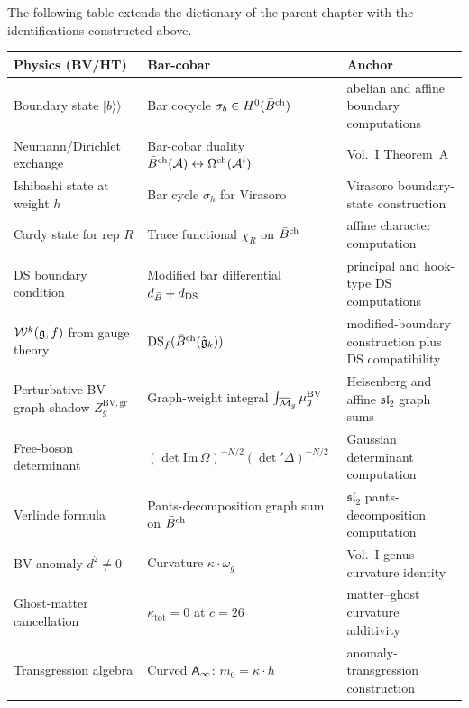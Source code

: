 \begin{remark}
The following table extends the dictionary of the parent chapter with
the identifications constructed above.

\begin{center}
\renewcommand{\arraystretch}{1.15}
\begin{tabular}{|p{}|p{}|p{}|}
\hline
\textbf{Physics (BV/HT)} &
\textbf{Bar-cobar} &
\textbf{Anchor} \\
\hline
Boundary state $|b\rangle\!\rangle$ &
Bar cocycle $\sigma_b \in H^0(\bar{B}^{\mathrm{ch}})$ &
abelian and affine boundary computations \\
\hline
Neumann/Dirichlet exchange &
Bar-cobar duality $\bar{B}^{\mathrm{ch}}(\mathcal{A}) \leftrightarrow \Omega^{\mathrm{ch}}(\mathcal{A}^i)$ &
Vol.~I Theorem~A \\
\hline
Ishibashi state at weight $h$ &
Bar cycle $\sigma_h$ for Virasoro &
Virasoro boundary-state construction \\
\hline
Cardy state for rep $R$ &
Trace functional $\chi_R$ on $\bar{B}^{\mathrm{ch}}$ &
affine character computation \\
\hline
DS boundary condition &
Modified bar differential $d_{\bar{B}} + d_{\mathrm{DS}}$ &
principal and hook-type DS computations \\
\hline
$\mathcal{W}^k(\mathfrak{g},f)$ from gauge theory &
$\mathrm{DS}_f(\bar{B}^{\mathrm{ch}}(\hat{\mathfrak{g}}_k))$ &
modified-boundary construction plus DS compatibility \\
\hline
Perturbative BV graph shadow $Z_g^{\mathrm{BV,gr}}$ &
Graph-weight integral $\int_{\overline{\mathcal{M}}_g} \mu^{\mathrm{BV}}_g$ &
Heisenberg and affine $\mathfrak{sl}_2$ graph sums \\
\hline
Free-boson determinant &
$(\det \mathrm{Im}\,\Omega)^{-N/2} (\det{}'\Delta)^{-N/2}$ &
Gaussian determinant computation \\
\hline
Verlinde formula &
Pants-decomposition graph sum on $\bar{B}^{\mathrm{ch}}$ &
$\mathfrak{sl}_2$ pants-decomposition computation \\
\hline
BV anomaly $d^2 \neq 0$ &
Curvature $\kappa \cdot \omega_g$ &
Vol.~I genus-curvature identity \\
\hline
Ghost-matter cancellation &
$\kappa_{\mathrm{tot}} = 0$ at $c = 26$ &
matter--ghost curvature additivity \\
\hline
Transgression algebra &
Curved $\mathsf{A}_{\infty}$: $m_0 = \kappa \cdot \hbar$ &
anomaly-transgression construction \\
\hline
\end{tabular}
\end{center}
\end{remark}

